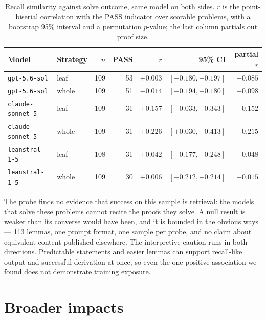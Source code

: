 \documentclass{article}
\begin{document}
\begin{table}[h]
  \caption{Recall similarity against solve outcome, same model on both sides. $r$ is the
  point-biserial correlation with the PASS indicator over scorable problems, with a bootstrap
  95\% interval and a permutation $p$-value; the last column partials out proof size.}
  \label{tab:recall-corr}
  \centering
  \small
  \begin{tabular}{llrrrrr}
    \toprule
    Model & Strategy & $n$ & PASS & $r$ & 95\% CI & partial $r$ \\
    \midrule
    \texttt{gpt-5.6-sol}     & leaf  & 109 & 53 & $+0.003$ & $[-0.180, +0.197]$ & $+0.085$ \\
    \texttt{gpt-5.6-sol}     & whole & 109 & 51 & $-0.014$ & $[-0.194, +0.180]$ & $+0.098$ \\
    \texttt{claude-sonnet-5} & leaf  & 109 & 31 & $+0.157$ & $[-0.033, +0.343]$ & $+0.152$ \\
    \texttt{claude-sonnet-5} & whole & 109 & 31 & $+0.226$ & $[+0.030, +0.413]$ & $+0.215$ \\
    \texttt{leanstral-1-5}   & leaf  & 108 & 31 & $+0.042$ & $[-0.177, +0.248]$ & $+0.048$ \\
    \texttt{leanstral-1-5}   & whole & 109 & 30 & $+0.006$ & $[-0.212, +0.214]$ & $+0.015$ \\
    \bottomrule
  \end{tabular}
\end{table}

The probe finds no evidence that success on this sample is retrieval: the models that solve
these problems cannot recite the proofs they solve. A null result is weaker than its
converse would have been, and it is bounded in the obvious ways --- 113 lemmas, one prompt
format, one sample per probe, and no claim about equivalent content published elsewhere.
The interpretive caution runs in both directions. Predictable statements and easier lemmas
can support recall-like output and successful derivation at once, so even the one positive
association we found does not demonstrate training exposure.

\section{Broader impacts}
\label{app:impacts}
\end{document}

